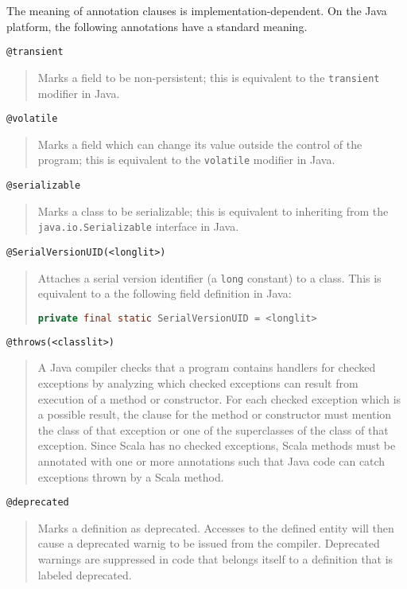 {The meaning of annotation clauses is implementation-dependent. On the
Java platform, the following annotations have a standard meaning.\bigskip

\lstinline^@transient^
\begin{quote}
Marks a field to be non-persistent; this is
equivalent to the \lstinline^transient^
modifier in Java.
\end{quote}

\lstinline^@volatile^
\begin{quote}Marks a field which can change its value
outside the control of the program; this
is equivalent to the \lstinline^volatile^
modifier in Java.
\end{quote}

\lstinline^@serializable^
\begin{quote}Marks a class to be serializable; this is
equivalent to inheriting from the 
\lstinline^java.io.Serializable^ interface
in Java.
\end{quote}

\lstinline^@SerialVersionUID(<longlit>)^
\begin{quote}Attaches a serial version identifier (a
\lstinline^long^ constant) to a class.
This is equivalent to a the following field
definition in Java:
\begin{lstlisting}[language=Java]
  private final static SerialVersionUID = <longlit> 
\end{lstlisting}
\end{quote}

\lstinline^@throws(<classlit>)^
\begin{quote}
A Java compiler checks that a program contains handlers for checked exceptions
by analyzing which checked exceptions can result from execution of a method or
constructor. For each checked exception which is a possible result, the 
clause for the method or constructor must mention the class of that exception
or one of the superclasses of the class of that exception. Since Scala has no
checked exceptions, Scala methods must be annotated with one or more 
annotations such that Java code can catch exceptions thrown by a Scala method.
\end{quote}

\lstinline^@deprecated^
\begin{quote} Marks a definition as deprecated. Accesses to the
  defined entity will then cause a
  deprecated warnig to be issued from the compiler.  Deprecated
  warnings are suppressed in code that belongs itself to a definition
  that is labeled deprecated.
\end{quote}

}
